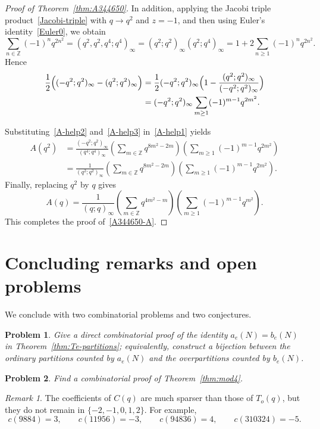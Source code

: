 \documentclass[reqno]{amsart}
\theoremstyle{plain}
\newtheorem{problem}{Problem}
\theoremstyle{definition}
\theoremstyle{remark}
\newtheorem{remark}{Remark}
\numberwithin{equation}{section}
\newcommand{\qpoch}[2]{(#1;#2)_\infty}
\begin{document}
\begin{proof}[Proof of Theorem~\ref{thm:A344650}]
In addition, applying the Jacobi triple product~\eqref{Jacobi-triple} with $q\to q^2$ and $z=-1$, and then using Euler's identity~\eqref{Euler0}, we obtain
\[
\sum_{n\in\mathbb Z}(-1)^n q^{2n^2}
=(q^2,q^2,q^4;q^4)_\infty
=(q^2;q^2)_\infty (q^2;q^4)_\infty
=1+2\sum_{n\ge 1}(-1)^n q^{2n^2}.
\]
Hence
\begin{align}
\frac12\Bigl(\qpoch{-q^2}{q^2}-\qpoch{q^2}{q^2}\Bigr)
&=\frac{1}{2}(-q^2;q^2)_\infty \Big( 1-\frac{(q^2;q^2)_\infty}{(-q^2;q^2)_\infty} \Big) \nonumber \\
&=\qpoch{-q^2}{q^2}\sum_{m\ge 1}(-1)^{m-1}q^{2m^2}.\label{A-help3}
\end{align}

Substituting~\eqref{A-help2} and~\eqref{A-help3} in~\eqref{A-help1} yields
\begin{align*}
A(q^2)
&=\frac{\qpoch{-q^2}{q^2}}{\qpoch{q^4}{q^4}}
\left(\sum_{m\in\mathbb Z} q^{8m^2-2m}\right)
\left(\sum_{m\ge 1}(-1)^{m-1}q^{2m^2}\right) \\
&=\frac{1}{\qpoch{q^2}{q^2}}
\left(\sum_{m\in\mathbb Z} q^{8m^2-2m}\right)
\left(\sum_{m\ge 1}(-1)^{m-1}q^{2m^2}\right).
\end{align*}
Finally, replacing $q^2$ by $q$ gives
\[
A(q)
=\frac{1}{\qpoch{q}{q}}
\left(\sum_{m\in\mathbb Z} q^{4m^2-m}\right)
\left(\sum_{m\ge 1}(-1)^{m-1}q^{m^2}\right).
\]
This completes the proof of~\eqref{A344650-A}.
\end{proof}
%
\section{Concluding remarks and open problems}\label{sec:remarks}
We conclude with two combinatorial problems and two conjectures.

\begin{problem}
Give a direct combinatorial proof of the identity $a_e(N)=b_e(N)$ in Theorem~\ref{thm:Te-partitions}; equivalently, construct a bijection between the ordinary partitions counted by $a_e(N)$ and the overpartitions counted by $b_e(N)$.
\end{problem}

\begin{problem}
Find a combinatorial proof of Theorem~\ref{thm:mod4}.
\end{problem}

\begin{remark}
The coefficients of $C(q)$ are much sparser than those of $T_o(q)$, but they do not remain in $\{-2,-1,0,1,2\}$. For example,
\[
c(9884)=3,\qquad c(11956)=-3,\qquad c(94836)=4,\qquad c(310324)=-5.
\]
\end{remark}
\end{document}
